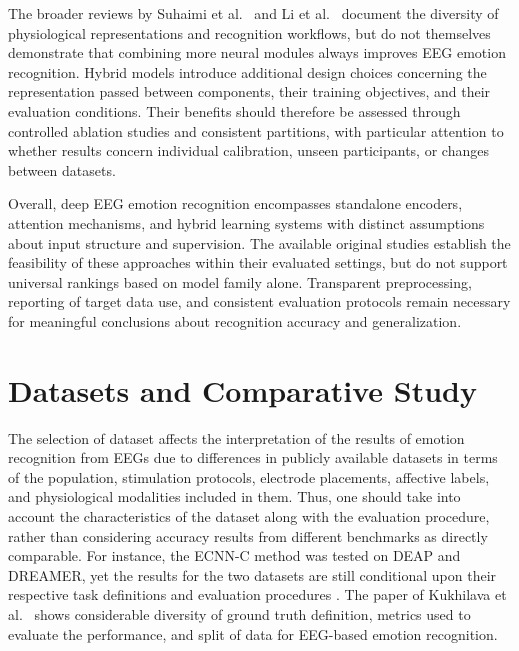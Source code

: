 \documentclass[ASNA,twocolumn]{USG}
\begin{document}
The broader reviews by Suhaimi et al.~\cite{suhaimi2020eeg} and Li et al.~\cite{li2021physiological} document the diversity of physiological representations and recognition workflows, but do not themselves demonstrate that combining more neural modules always improves EEG emotion recognition. Hybrid models introduce additional design choices concerning the representation passed between components, their training objectives, and their evaluation conditions. Their benefits should therefore be assessed through controlled ablation studies and consistent partitions, with particular attention to whether results concern individual calibration, unseen participants, or changes between datasets.

Overall, deep EEG emotion recognition encompasses standalone encoders, attention mechanisms, and hybrid learning systems with distinct assumptions about input structure and supervision. The available original studies establish the feasibility of these approaches within their evaluated settings, but do not support universal rankings based on model family alone. Transparent preprocessing, reporting of target data use, and consistent evaluation protocols remain necessary for meaningful conclusions about recognition accuracy and generalization.

\section{Datasets and Comparative Study}
\label{sec:datasets_comparative}

The selection of dataset affects the interpretation of the results of emotion recognition from EEGs due to differences in publicly available datasets in terms of the population, stimulation protocols, electrode placements, affective labels, and physiological modalities included in them. Thus, one should take into account the characteristics of the dataset along with the evaluation procedure, rather than considering accuracy results from different benchmarks as directly comparable. For instance, the ECNN-C method was tested on DEAP and DREAMER, yet the results for the two datasets are still conditional upon their respective task definitions and evaluation procedures \cite{li2022eeg}. The paper of Kukhilava et al.~\cite{kukhilava2025evaluation} shows considerable diversity of ground truth definition, metrics used to evaluate the performance, and split of data for EEG-based emotion recognition.
\end{document}
